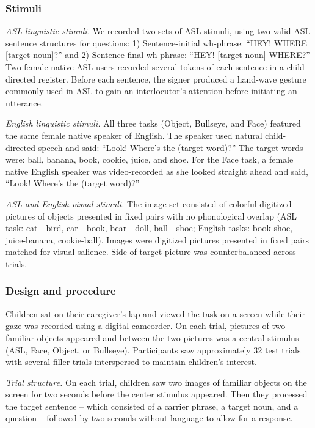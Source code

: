 \documentclass[10pt, letterpaper]{article}
\begin{document}
\subsubsection{Stimuli}\label{stimuli}

\emph{ASL linguistic stimuli.} We recorded two sets of ASL stimuli,
using two valid ASL sentence structures for questions: 1)
Sentence-initial wh-phrase: ``HEY! WHERE {[}target noun{]}?'' and 2)
Sentence-final wh-phrase: ``HEY! {[}target noun{]} WHERE?'' Two female
native ASL users recorded several tokens of each sentence in a
child-directed register. Before each sentence, the signer produced a
hand-wave gesture commonly used in ASL to gain an interlocutor's
attention before initiating an utterance.

\emph{English linguistic stimuli.} All three tasks (Object, Bullseye,
and Face) featured the same female native speaker of English. The
speaker used natural child-directed speech and said: ``Look! Where's the
(target word)?'' The target words were: ball, banana, book, cookie,
juice, and shoe. For the Face task, a female native English speaker was
video-recorded as she looked straight ahead and said, ``Look! Where's
the (target word)?''

\emph{ASL and English visual stimuli.} The image set consisted of
colorful digitized pictures of objects presented in fixed pairs with no
phonological overlap (ASL task: cat---bird, car---book, bear---doll,
ball---shoe; English tasks: book-shoe, juice-banana, cookie-ball).
Images were digitized pictures presented in fixed pairs matched for
visual salience. Side of target picture was counterbalanced across
trials.

\subsubsection{Design and procedure}\label{design-and-procedure}

Children sat on their caregiver's lap and viewed the task on a screen
while their gaze was recorded using a digital camcorder. On each trial,
pictures of two familiar objects appeared and between the two pictures
was a central stimulus (ASL, Face, Object, or Bullseye). Participants
saw approximately 32 test trials with several filler trials interspersed
to maintain children's interest.

\emph{Trial structure.} On each trial, children saw two images of
familiar objects on the screen for two seconds before the center
stimulus appeared. Then they processed the target sentence -- which
consisted of a carrier phrase, a target noun, and a question -- followed
by two seconds without language to allow for a response.
\end{document}
